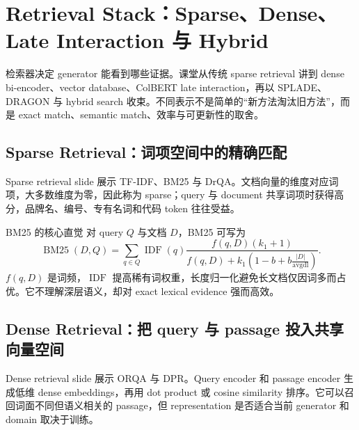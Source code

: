 \section{Retrieval Stack：Sparse、Dense、Late Interaction 与 Hybrid}

检索器决定 generator 能看到哪些证据。课堂从传统 sparse retrieval 讲到 dense bi-encoder、vector database、ColBERT late interaction，再以 SPLADE、DRAGON 与 hybrid search 收束。不同表示不是简单的“新方法淘汰旧方法”，而是 exact match、semantic match、效率与可更新性的取舍。

\subsection{Sparse Retrieval：词项空间中的精确匹配}

Sparse retrieval slide 展示 TF-IDF、BM25 与 DrQA。文档向量的维度对应词项，大多数维度为零，因此称为 sparse；query 与 document 共享词项时获得高分，品牌名、编号、专有名词和代码 token 往往受益。


\begin{importantbox}{BM25 的核心直觉}
对 query $Q$ 与文档 $D$，BM25 可写为
\[
\operatorname{BM25}(D,Q)=\sum_{q\in Q}\operatorname{IDF}(q)
\frac{f(q,D)(k_1+1)}{f(q,D)+k_1\left(1-b+b\frac{|D|}{\operatorname{avgdl}}\right)}.
\]
$f(q,D)$ 是词频，$\operatorname{IDF}$ 提高稀有词权重，长度归一化避免长文档仅因词多而占优。它不理解深层语义，却对 exact lexical evidence 强而高效。
\end{importantbox}


\subsection{Dense Retrieval：把 query 与 passage 投入共享向量空间}

Dense retrieval slide 展示 ORQA 与 DPR。Query encoder 和 passage encoder 生成低维 dense embeddings，再用 dot product 或 cosine similarity 排序。它可以召回词面不同但语义相关的 passage，但 representation 是否适合当前 generator 和 domain 取决于训练。


